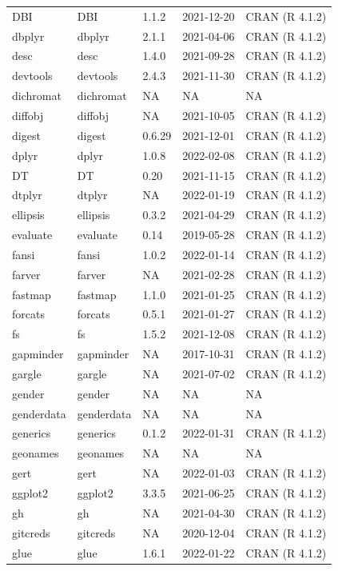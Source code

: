 \begin{tabular}{lllll}
\addlinespace
DBI & DBI & 1.1.2 & 2021-12-20 & CRAN (R 4.1.2)\\
dbplyr & dbplyr & 2.1.1 & 2021-04-06 & CRAN (R 4.1.2)\\
desc & desc & 1.4.0 & 2021-09-28 & CRAN (R 4.1.2)\\
devtools & devtools & 2.4.3 & 2021-11-30 & CRAN (R 4.1.2)\\
dichromat & dichromat & NA & NA & NA\\
\addlinespace
diffobj & diffobj & NA & 2021-10-05 & CRAN (R 4.1.2)\\
digest & digest & 0.6.29 & 2021-12-01 & CRAN (R 4.1.2)\\
dplyr & dplyr & 1.0.8 & 2022-02-08 & CRAN (R 4.1.2)\\
DT & DT & 0.20 & 2021-11-15 & CRAN (R 4.1.2)\\
dtplyr & dtplyr & NA & 2022-01-19 & CRAN (R 4.1.2)\\
\addlinespace
ellipsis & ellipsis & 0.3.2 & 2021-04-29 & CRAN (R 4.1.2)\\
evaluate & evaluate & 0.14 & 2019-05-28 & CRAN (R 4.1.2)\\
fansi & fansi & 1.0.2 & 2022-01-14 & CRAN (R 4.1.2)\\
farver & farver & NA & 2021-02-28 & CRAN (R 4.1.2)\\
fastmap & fastmap & 1.1.0 & 2021-01-25 & CRAN (R 4.1.2)\\
\addlinespace
forcats & forcats & 0.5.1 & 2021-01-27 & CRAN (R 4.1.2)\\
fs & fs & 1.5.2 & 2021-12-08 & CRAN (R 4.1.2)\\
gapminder & gapminder & NA & 2017-10-31 & CRAN (R 4.1.2)\\
gargle & gargle & NA & 2021-07-02 & CRAN (R 4.1.2)\\
gender & gender & NA & NA & NA\\
\addlinespace
genderdata & genderdata & NA & NA & NA\\
generics & generics & 0.1.2 & 2022-01-31 & CRAN (R 4.1.2)\\
geonames & geonames & NA & NA & NA\\
gert & gert & NA & 2022-01-03 & CRAN (R 4.1.2)\\
ggplot2 & ggplot2 & 3.3.5 & 2021-06-25 & CRAN (R 4.1.2)\\
\addlinespace
gh & gh & NA & 2021-04-30 & CRAN (R 4.1.2)\\
gitcreds & gitcreds & NA & 2020-12-04 & CRAN (R 4.1.2)\\
glue & glue & 1.6.1 & 2022-01-22 & CRAN (R 4.1.2)\\

\end{tabular}
